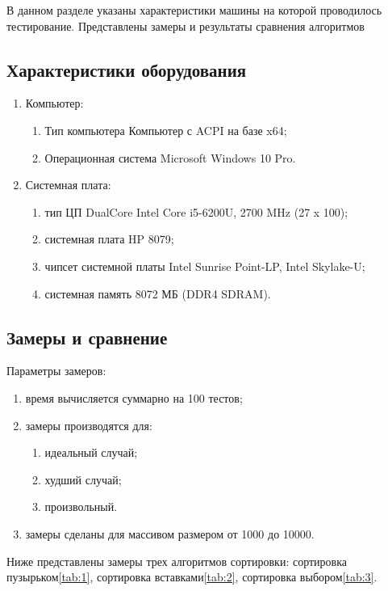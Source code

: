 В данном разделе указаны характеристики машины на которой проводилось тестирование. Представлены замеры и результаты сравнения алгоритмов

\subsection{Характеристики оборудования}
	\begin{enumerate}
		\item Компьютер:
		\begin{enumerate}
			\item Тип компьютера   Компьютер с ACPI на базе x64;
			\item Операционная система   Microsoft Windows 10 Pro.
		\end{enumerate}
		\item Системная плата:
		\begin{enumerate}
			\item тип ЦП   DualCore Intel Core i5-6200U, 2700 MHz (27 x 100);
			\item системная плата   HP 8079;
			\item чипсет системной платы   Intel Sunrise Point-LP, Intel Skylake-U;
			\item системная память   8072 МБ (DDR4 SDRAM).
		\end{enumerate}
	\end{enumerate}

\subsection{Замеры и сравнение}
	
	Параметры замеров:
	\begin{enumerate}[1)]
		\item время вычисляется суммарно на 100 тестов;
		\item замеры производятся для:
		\begin{enumerate}
			\item идеальный случай;
			\item худший случай;
			\item произвольный.
		\end{enumerate}
		\item замеры сделаны для массивом размером от 1000 до 10000.
	\end{enumerate}

	Ниже представлены замеры трех алгоритмов сортировки: сортировка пузырьком\ref{tab:1}, сортировка вставками\ref{tab:2}, сортировка выбором\ref{tab:3}.
	
